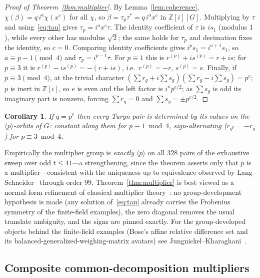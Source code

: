 \documentclass[11pt]{article}
\theoremstyle{plain}
\newtheorem{corollary}[theorem]{Corollary}
\theoremstyle{definition}
\theoremstyle{remark}
\newcommand{\Z}{\mathbb Z}
\begin{document}
\begin{proof}[Proof of Theorem~\ref{thm:multiplier}]
By Lemma~\ref{lem:coherence}, $\chi(\beta)=q\,i^a\chi(x^c)$ for all $\chi$, so
$\beta=\tau_p\tau^*=q\,i^a x^c$ in $\Z[i][G]$. Multiplying by $\tau$ and
using~\eqref{eq:tau} gives $\tau_p=i^a x^c\tau$. The identity coefficient of
$\tau$ is $is_1$ (modulus $1$), while every other has modulus $\sqrt2$; the same
holds for $\tau_p$ and decimation fixes the identity, so $c=0$. Comparing
identity coefficients gives $i^p s_1=i^{a+1}s_1$, so $a\equiv p-1\pmod4$ and
$\tau_p=i^{p-1}\tau$. For $p\equiv1$ this is $r^{(p)}+is^{(p)}=r+is$; for
$p\equiv3$ it is $r^{(p)}-is^{(p)}=-(r+is)$, i.e.\ $r^{(p)}=-r$, $s^{(p)}=s$.
Finally, if $p\equiv3\pmod4$, at the trivial character
$(\sum r_g+i\sum s_g)(\sum r_g-i\sum s_g)=p^e$; $p$ is inert in $\Z[i]$, so $e$
is even and the left factor is $i^\kappa p^{e/2}$; as $\sum s_g$ is odd its
imaginary part is nonzero, forcing $\sum r_g=0$ and $\sum s_g=\pm p^{e/2}$.
\end{proof}

\begin{corollary}\label{cor:orbits}
If $q=p^e$ then every Turyn pair is determined by its values on the
$\langle p\rangle$-orbits of $G$: constant along them for $p\equiv1\bmod4$,
sign-alternating ($r_{g^p}=-r_g$) for $p\equiv3\bmod4$.
\end{corollary}

Empirically the multiplier group is \emph{exactly} $\langle p\rangle$ on all
$328$ pairs of the exhaustive sweep over odd $t\le41$---a strengthening, since
the theorem asserts only that $p$ is a multiplier---consistent with the
uniqueness up to equivalence observed by Lang--Schneider~\cite{LS12} through
order $99$. Theorem~\ref{thm:multiplier} is best viewed as a normal-form
refinement of classical multiplier theory~\cite{Hall67}: no group-development hypothesis is
made (any solution of~\eqref{eq:tau} already carries the Frobenius symmetry of
the finite-field examples), the zero diagonal removes the usual translate
ambiguity, and the signs are pinned exactly. For the group-developed objects
behind the finite-field examples (Bose's affine relative difference set and its
balanced-generalized-weighing-matrix avatars) see
Jungnickel--Kharaghani~\cite{JK}.

\subsection{Composite common-decomposition multipliers}
\label{sec:composite-multiplier}
\end{document}
